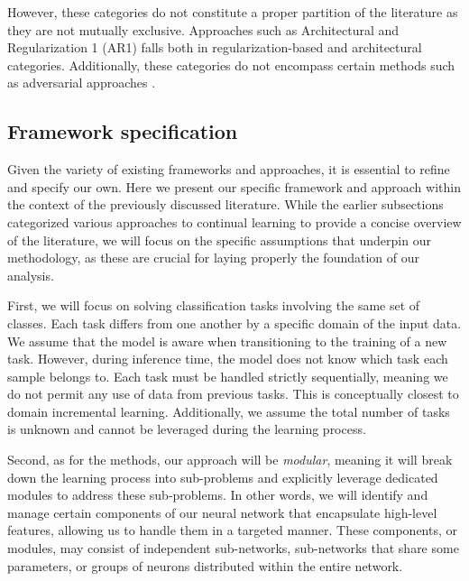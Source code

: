 \documentclass[11pt]{article}
\begin{document}
\vspace{2mm}
\noindent
However, these categories do not constitute a proper partition of the literature as they are not mutually exclusive. Approaches such as Architectural and Regularization 1 (AR1) \cite{AR1} falls both in regularization-based and architectural categories. Additionally, these categories do not encompass certain methods such as adversarial approaches \cite{EWC_6_Adversarial_CL}.


\subsection{Framework specification} \label{sec:framework_specification}


Given the variety of existing frameworks and approaches, it is essential to refine and specify our own. Here we present our specific framework and approach within the context of the previously discussed literature. While the earlier subsections categorized various approaches to continual learning to provide a concise overview of the literature, we will focus on the specific assumptions that underpin our methodology, as these are crucial for laying properly the foundation of our analysis.

\vspace{2mm}
\noindent
First, we will focus on solving classification tasks involving the same set of classes. Each task differs from one another by a specific domain of the input data. We assume that the model is aware when transitioning to the training of a new task. However, during inference time, the model does not know which task each sample belongs to. Each task must be handled strictly sequentially, meaning we do not permit any use of data from previous tasks. This is conceptually closest to domain incremental learning. Additionally, we assume the total number of tasks is unknown and cannot be leveraged during the learning process.

\vspace{2mm}
\noindent
Second, as for the methods, our approach will be \textit{modular}, meaning it will break down the learning process into sub-problems and explicitly leverage dedicated modules to address these sub-problems. In other words, we will identify and manage certain components of our neural network that encapsulate high-level features, allowing us to handle them in a targeted manner. These components, or modules, may consist of independent sub-networks, sub-networks that share some parameters, or groups of neurons distributed within the entire network.
\end{document}
